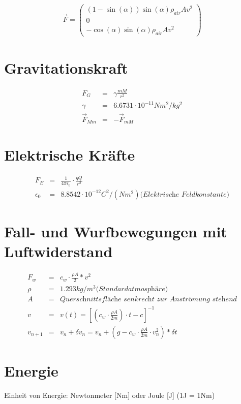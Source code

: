 \documentclass[11pt]{article}
\begin{document}
\begin{eqnarray*}
\overrightarrow{F} = \begin{pmatrix}
						(1-\sin(\alpha))\sin(\alpha)\rho_{air}Av^2\\
						0\\
						-\cos(\alpha)\sin(\alpha)\rho_{air}Av^2
					\end{pmatrix}	
\end{eqnarray*}

\section{Gravitationskraft}
\begin{eqnarray*}
F_G &=& \gamma \frac{mM}{r^2}\\
\gamma &=& 6.6731\cdot 10^{-11} Nm^2/kg^2\\
\overrightarrow{F}_{Mm} &=& -\overrightarrow{F}_{mM}
\end{eqnarray*}

\section{Elektrische Kräfte}
\begin{eqnarray*}
F_E &=& \frac{1}{4\pi\epsilon_0}\cdot\frac{qQ}{r^2}\\
\epsilon_0 &=& 8.8542\cdot 10^{-12}C^2/(Nm^2) \textit{(Elektrische Feldkonstante)}
\end{eqnarray*}

\section{Fall- und Wurfbewegungen mit Luftwiderstand}
\begin{eqnarray*}
F_w&=& c_w \cdot \frac{\rho A}{2}*v^2\\
\rho &=& 1.293 kg/m^3 \textit{(Standardatmosphäre)}\\
A &=& \textit{Querschnittsfläche senkrecht zur Anströmung stehend}\\
v &=& v(t) = [(c_w \cdot \frac{\rho A}{2m})\cdot t - c]^{-1}\\
v_{n+1} &=& v_n+\delta v_n = v_n + (g-c_w\cdot\frac{\rho A}{2m} \cdot v_n^2)*\delta t
\end{eqnarray*}

\section{Energie}
Einheit von Energie: Newtonmeter [Nm] oder Joule [J] (1J = 1Nm)
\end{document}

